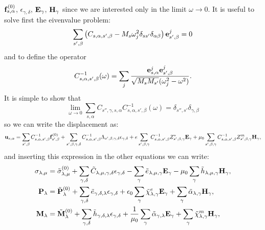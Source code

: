 \documentclass[12pt,a4paper]{article}
\begin{document}
${\bf f}^{(0)}_{s,\alpha}$, $\epsilon_{\gamma,\delta}$,
${\bf E}_{\gamma}$,
${\bf H}_{\gamma}$ since we are interested only in the limit 
$\omega \rightarrow 0$.
It is useful to solve first the eivenvalue problem:
\begin{equation}
\sum_{s',\beta} \left(C_{s,\alpha,s',\beta} - 
M_s \omega_j^2 \delta_{ss'}\delta_{\alpha\beta}\right){\bf e}^j_{s',\beta}=0
\end{equation}
and to define the operator
\begin{equation}
C^{-1}_{s,\alpha,s',\beta}(\omega) = \sum_j {{\bf e}^j_{s,\alpha} 
{\bf e}^j_{s',\beta}
\over \sqrt{M_s M_{s'}}(\omega^2_j - \omega^2)}.
\end{equation}
It is simple to show that
\begin{equation}
\lim_{\omega\rightarrow 0} \sum_{s,\alpha} C_{s'',\gamma,s,\alpha} C^{-1}_{s,\alpha,s',\beta}(\omega)
=\delta_{s'',s'} \delta_{\gamma,\beta}
\end{equation}
so we can write the displacement as:
\begin{equation}
{\bf u}_{s,\alpha}=\sum_{s',\beta} C^{-1}_{s,\alpha,s',\beta}
{\bf f}^{(0)}_{s',\beta} + \sum_{s',\beta,\gamma,\delta} 
C^{-1}_{s,\alpha,s',\beta}
\Lambda_{s',\beta,\gamma,\delta} \epsilon_{\gamma,\delta}
+ e \sum_{s',\beta,\gamma} C^{-1}_{s,\alpha,s',\beta}
Z^*_{s',\beta,\gamma} {\bf E}_{\gamma} 
+ \mu_0 \sum_{s',\beta,\gamma} C^{-1}_{s,\alpha,s',\beta} 
Z^m_{s',\beta,\gamma} 
{\bf H}_{\gamma},
\end{equation}
and inserting this expression in the other equations we can write:
\begin{align}
\sigma_{\lambda,\mu}&= \tilde \sigma_{\lambda,\mu}^{(0)}
+\sum_{\gamma,\delta} \tilde C_{\lambda,\mu,\gamma,\delta}  
\epsilon_{\gamma,\delta} -
\sum_{\gamma} \tilde e_{\lambda,\mu,\gamma} 
 {\bf E}_{\gamma}
-\mu_0 \sum_{\gamma}  \tilde h_{\lambda,\mu,\gamma} 
{\bf H}_{\gamma}, \\
{\bf P}_{\lambda}&= \tilde {\bf P}^{(0)}_{\lambda}
+\sum_{\gamma,\delta} \tilde e_{\gamma,\delta,\lambda} 
\epsilon_{\gamma,\delta} +
\epsilon_0 \sum_{\gamma} 
\tilde \chi^e_{\lambda,\gamma}
{\bf E}_{\gamma} +
\sum_{\gamma} \tilde \alpha_{\lambda,\gamma} 
{\bf H}_{\gamma}, \\
{\bf M}_{\lambda}&= \tilde {\bf M}^{(0)}_{\lambda}
+\sum_{\gamma,\delta}  \tilde h_{\gamma,\delta,\lambda} 
\epsilon_{\gamma,\delta} 
+{1\over \mu_0} \sum_{\gamma} \tilde \alpha_{\gamma,\lambda} {\bf E}_{\gamma}
+\sum_{\gamma} 
\tilde \chi^m_{\lambda,\gamma}
{\bf H}_{\gamma},
\end{align}
\end{document}
